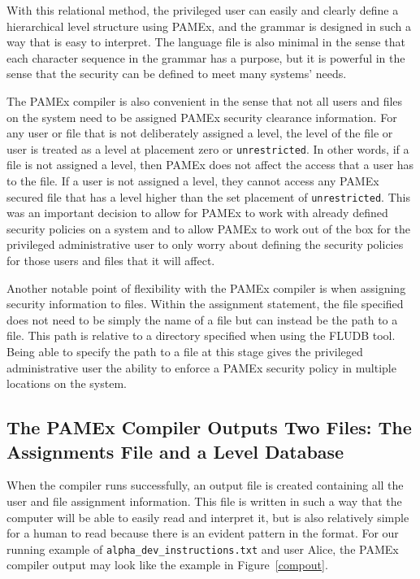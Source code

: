 With this relational method, the privileged user can easily 
and clearly define a hierarchical level structure using PAMEx, and the 
grammar is designed in such a way that is easy to interpret. The language file is also minimal in the 
sense that each character sequence in the grammar has a purpose, but it 
is powerful in the sense that the security can be defined to meet many 
systems' needs. 

The PAMEx compiler is also convenient in the sense that not all users and 
files on the system need to be assigned PAMEx security clearance 
information. For any user or file that is not deliberately assigned a 
level, the level of the file or user is treated as a level at placement 
zero or \texttt{unrestricted}. In other words, if a file is not assigned a level, 
then PAMEx does not affect the access that a user has to the file. If a 
user is not assigned a level, they cannot access any PAMEx secured file 
that has a level higher than the set placement of \texttt{unrestricted}. This 
was an important decision to allow for PAMEx to work 
with already defined security policies on a system and to allow PAMEx 
to work out of the box for the privileged administrative user to only 
worry about defining the security policies for those users and files 
that it will affect. 

Another notable point of flexibility with the PAMEx compiler is when 
assigning security information to files. Within the assignment 
statement, the file specified does not need to be simply the name of a 
file but can instead be the path to a file. This path is relative to a 
directory specified when using the FLUDB tool. Being able to specify the 
path to a file at this stage gives the privileged administrative user the ability 
to enforce a PAMEx security policy in multiple locations on the system. 
\vspace{\baselineskip}

\subsection{The PAMEx Compiler Outputs Two Files: The Assignments File and a Level Database} \label{policy-out}
\par 
\vspace{\baselineskip}
\hspace{1em}
When the compiler runs successfully, an output file is created containing all 
the user and file assignment information. This file is written in such a 
way that the computer will be able to easily read and interpret it, but is also relatively simple for a human to read because 
there is an evident pattern in the format. For our running example of 
\texttt{alpha}\texttt{\_dev}\texttt{\_instructions.txt} and user Alice, the PAMEx compiler output may look like
the example in Figure~\ref{compout}.
\clearpage

